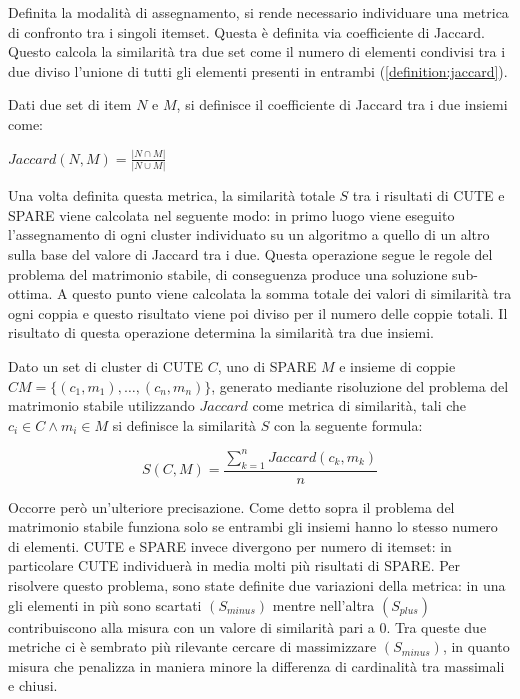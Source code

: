 Definita la modalità di assegnamento, si rende necessario individuare una metrica di confronto tra i singoli itemset.
Questa è definita via coefficiente di Jaccard.
Questo calcola la similarità tra due set come il numero di elementi condivisi tra i due diviso l'unione di tutti gli elementi presenti in entrambi (\cref{definition:jaccard}).

\begin{definition}\label{definition:jaccard}

 Dati due set di item \(N\) e \(M\), si definisce il coefficiente di Jaccard tra i due insiemi come: 
    \begin{center}
        \(Jaccard(N,M) = \frac{|N \cap M|}{|N \cup M|}\) 
    \end{center}
\end{definition}

Una volta definita questa metrica, la similarità totale \(S\) tra i risultati di CUTE e SPARE viene calcolata nel seguente modo:
in primo luogo viene eseguito l'assegnamento di ogni cluster individuato su un algoritmo a quello di un altro sulla base del valore di Jaccard tra i due.
Questa operazione segue le regole del problema del matrimonio stabile, di conseguenza produce una soluzione sub-ottima.
A questo punto viene calcolata la somma totale dei valori di similarità tra ogni coppia e questo risultato viene poi diviso per il numero delle coppie totali.
Il risultato di questa operazione determina la similarità tra due insiemi.

\begin{definition}\label{definition:cluster-similarity}

Dato un set di cluster di CUTE \(C\), uno di SPARE \(M\) e insieme di coppie \(CM = \{(c_1, m_1), \ldots, (c_n, m_n)\}\), generato mediante risoluzione del problema del matrimonio stabile utilizzando \(Jaccard\) come metrica di similarità, tali che \( c_ i \in C \land m_i \in M\) si definisce la similarità \(S\) con la seguente formula:

  \begin{equation}
     S(C, M) = \frac{\sum_{k=1}^{n}{Jaccard(c_k, m_k)}}{n} 
    \end{equation}

\end{definition}

Occorre però un'ulteriore precisazione.
Come detto sopra il problema del matrimonio stabile funziona solo se entrambi gli insiemi hanno lo stesso numero di elementi.
CUTE e SPARE invece divergono per numero di itemset: in particolare CUTE individuerà in media molti più risultati di SPARE.
Per risolvere questo problema, sono state definite due variazioni della metrica: in una gli elementi in più sono scartati \((S_{minus})\) mentre nell'altra \((S_{plus})\) contribuiscono alla misura con un valore di similarità pari a \(0\).
Tra queste due metriche ci è sembrato più rilevante cercare di massimizzare \((S_{minus})\), in quanto misura che penalizza in maniera minore la differenza di cardinalità tra massimali e chiusi.

